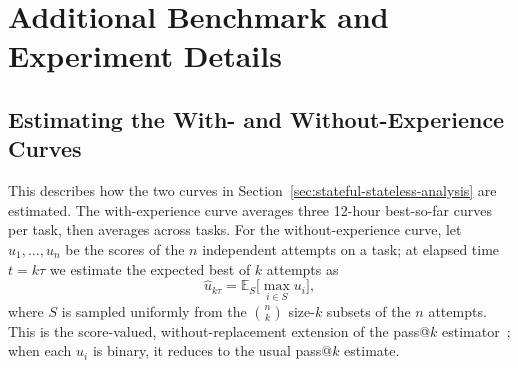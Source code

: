 \section{Additional Benchmark and Experiment Details}
\label{sec:additional-benchmark-details}

\subsection{Estimating the With- and Without-Experience Curves}
\label{sec:experience-gain-estimation}

This describes how the two curves in Section~\ref{sec:stateful-stateless-analysis} are estimated. The with-experience curve averages three 12-hour best-so-far curves per task, then averages across tasks. For the without-experience curve, let $u_1,\ldots,u_n$ be the scores of the $n$ independent attempts on a task; at elapsed time $t=k\tau$ we estimate the expected best of $k$ attempts as
\begin{equation}
\hat{u}_{k\tau} = \mathbb{E}_{S}\big[\max_{i\in S} u_i\big],
\end{equation}
where $S$ is sampled uniformly from the $\binom{n}{k}$ size-$k$ subsets of the $n$ attempts. This is the score-valued, without-replacement extension of the pass@$k$ estimator~\cite{chen2021humaneval}; when each $u_i$ is binary, it reduces to the usual pass@$k$ estimate.

